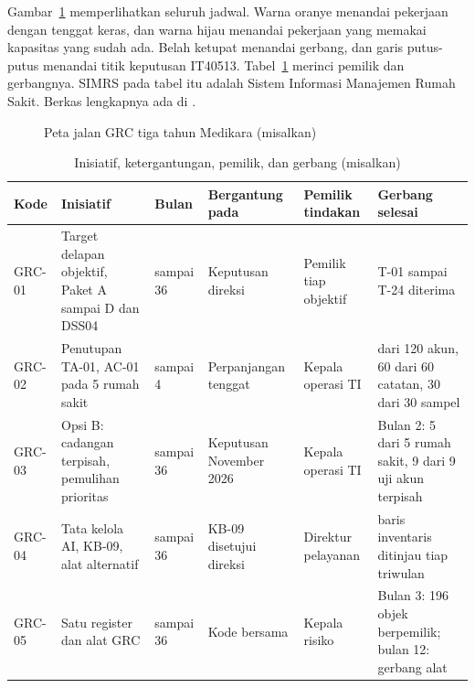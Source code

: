 Gambar~\ref{fig:ch14-peta-jalan} memperlihatkan seluruh jadwal. Warna oranye menandai pekerjaan
dengan tenggat keras, dan warna hijau menandai pekerjaan yang memakai kapasitas yang sudah ada.
Belah ketupat menandai gerbang, dan garis putus-putus menandai titik keputusan IT40513.
Tabel~\ref{tab:ch14-peta-jalan} merinci pemilik dan gerbangnya. SIMRS pada tabel itu adalah Sistem
Informasi Manajemen Rumah Sakit. Berkas lengkapnya ada di
.

\begin{figure}[!htb]
  \centering
  
  \caption{Peta jalan GRC tiga tahun Medikara (misalkan)}
  \label{fig:ch14-peta-jalan}
\end{figure}

\begin{table}[!htb]
  \centering\footnotesize
  \caption{Inisiatif, ketergantungan, pemilik, dan gerbang (misalkan)}\label{tab:ch14-peta-jalan}
  \begin{tabularx}{\textwidth}{|>{\raggedright\arraybackslash}p{}|>{\raggedright\arraybackslash}X|>{\raggedright\arraybackslash}p{}|>{\raggedright\arraybackslash}p{}|>{\raggedright\arraybackslash}p{}|>{\raggedright\arraybackslash}X|}
    \hline
    \textbf{Kode} & \textbf{Inisiatif} & \textbf{Bulan} & \textbf{Bergantung pada} & \textbf{Pemilik
    tindakan} & \textbf{Gerbang selesai} \\ \hline
    GRC-01 & Target delapan objektif, Paket A sampai D dan DSS04 & 1 sampai 36 & Keputusan direksi
    & Pemilik tiap objektif & T-01 sampai T-24 diterima \\ \hline
    GRC-02 & Penutupan TA-01, AC-01 pada 5 rumah sakit & 1 sampai 4 & Perpanjangan tenggat & Kepala
    operasi TI & 120 dari 120 akun, 60 dari 60 catatan, 30 dari 30 sampel \\ \hline
    GRC-03 & Opsi B: cadangan terpisah, pemulihan prioritas & 1 sampai 36 & Keputusan November 2026
    & Kepala operasi TI & Bulan 2: 5 dari 5 rumah sakit, 9 dari 9 uji akun terpisah \\ \hline
    GRC-04 & Tata kelola AI, KB-09, alat alternatif & 1 sampai 36 & KB-09 disetujui direksi &
    Direktur pelayanan & 6 baris inventaris ditinjau tiap triwulan \\ \hline
    GRC-05 & Satu register dan alat GRC & 1 sampai 36 & Kode bersama & Kepala risiko & Bulan 3: 196
    objek berpemilik; bulan 12: gerbang alat \\ \hline

\end{tabularx}
\end{table}
